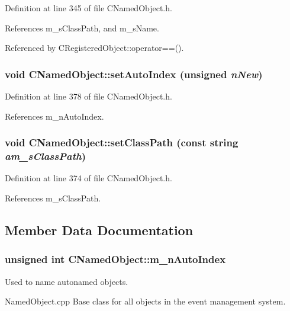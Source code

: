 Definition at line 345 of file CNamed\-Object.h.

References m\_\-s\-Class\-Path, and m\_\-s\-Name.

Referenced by CRegistered\-Object::operator==().
\subsubsection{\setlength{\rightskip}{0pt plus 5cm}void CNamed\-Object::set\-Auto\-Index (unsigned {\em n\-New})\hspace{0.3cm}{\tt  [inline, protected]}}\label{classCNamedObject_b1}




Definition at line 378 of file CNamed\-Object.h.

References m\_\-n\-Auto\-Index.
\subsubsection{\setlength{\rightskip}{0pt plus 5cm}void CNamed\-Object::set\-Class\-Path (const string {\em am\_\-s\-Class\-Path})\hspace{0.3cm}{\tt  [inline, protected]}}\label{classCNamedObject_b0}




Definition at line 374 of file CNamed\-Object.h.

References m\_\-s\-Class\-Path.

\subsection{Member Data Documentation}
\subsubsection{\setlength{\rightskip}{0pt plus 5cm}unsigned int CNamed\-Object::m\_\-n\-Auto\-Index\hspace{0.3cm}{\tt  [static, private]}}\label{classCNamedObject_r0}


Used to name autonamed objects.

Named\-Object.cpp Base class for all objects in the event management system.

